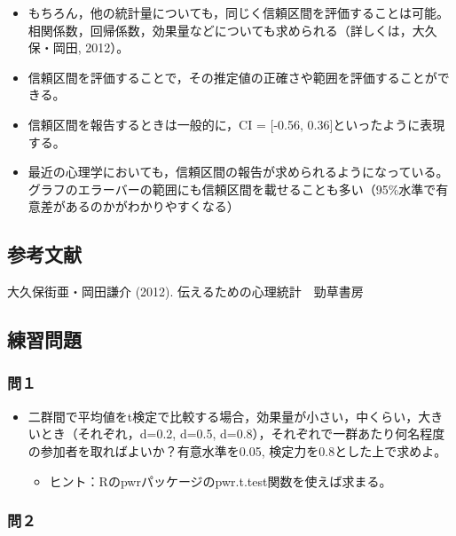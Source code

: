 \documentclass[]{article}
\providecommand{\tightlist}{%
  \setlength{\itemsep}{0pt}\setlength{\parskip}{0pt}}
\begin{document}
\begin{itemize}
\item
  もちろん，他の統計量についても，同じく信頼区間を評価することは可能。相関係数，回帰係数，効果量などについても求められる（詳しくは，大久保・岡田,
  2012）。
\item
  信頼区間を評価することで，その推定値の正確さや範囲を評価することができる。\\
\item
  信頼区間を報告するときは一般的に，CI = {[}-0.56,
  0.36{]}といったように表現する。
\item
  最近の心理学においても，信頼区間の報告が求められるようになっている。グラフのエラーバーの範囲にも信頼区間を載せることも多い（95\%水準で有意差があるのかがわかりやすくなる）
\end{itemize}

\subsection{参考文献}\label{-1}

大久保街亜・岡田謙介 (2012). 伝えるための心理統計　勁草書房

\subsection{練習問題}\label{-7}

\subsubsection{問１}\label{-15}

\begin{itemize}
\tightlist
\item
  二群間で平均値をt検定で比較する場合，効果量が小さい，中くらい，大きいとき（それぞれ，d=0.2,
  d=0.5,
  d=0.8），それぞれで一群あたり何名程度の参加者を取ればよいか？有意水準を0.05,
  検定力を0.8とした上で求めよ。

  \begin{itemize}
  \tightlist
  \item
    ヒント：Rのpwrパッケージのpwr.t.test関数を使えば求まる。
  \end{itemize}
\end{itemize}

\subsubsection{問２}\label{-16}
\end{document}
